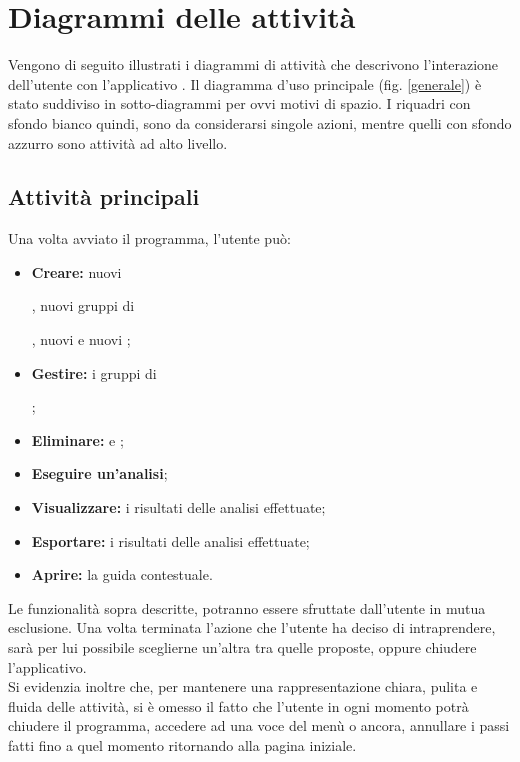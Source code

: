 \section{Diagrammi delle attività}
\label{diagrammiAtt}
Vengono di seguito illustrati i diagrammi di attività che descrivono l'interazione dell'utente con l'applicativo \project{}. Il diagramma d'uso principale (fig. \ref{generale}) è stato suddiviso in sotto-diagrammi per ovvi motivi di spazio. I riquadri con sfondo bianco quindi, sono da considerarsi singole azioni, mentre quelli con sfondo azzurro sono attività ad alto livello.

\subsection{Attività principali}
\label{principle}
Una volta avviato il programma, l'utente può:
\begin{itemize}
\item\textbf{Creare:} nuovi \subject{}, nuovi gruppi di \subject{}, nuovi \protocol{} e nuovi \dataset{};
\item\textbf{Gestire:} i gruppi di \subject{};
\item\textbf{Eliminare:} \protocol{} e \dataset{};
\item\textbf{Eseguire un'analisi};
\item\textbf{Visualizzare:} i risultati delle analisi effettuate;
\item\textbf{Esportare:} i risultati delle analisi effettuate;
\item\textbf{Aprire:} la guida contestuale.
\end{itemize}
Le funzionalità sopra descritte, potranno essere sfruttate dall'utente in mutua esclusione. Una volta terminata l'azione che l'utente ha deciso di intraprendere, sarà per lui possibile sceglierne un'altra tra quelle proposte, oppure chiudere l'applicativo.
\\Si evidenzia inoltre che, per mantenere una rappresentazione chiara, pulita e fluida delle attività, si è omesso il fatto che l'utente in ogni momento potrà chiudere il programma, accedere ad una voce del menù o ancora, annullare i passi fatti fino a quel momento ritornando alla pagina iniziale.
\pagebreak

